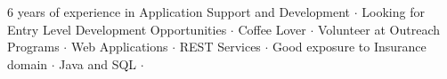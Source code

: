

\begin{cvparagraph}
6 years of experience in Application Support and Development ${\cdotp}$ Looking for Entry Level Development Opportunities ${\cdotp}$ Coffee Lover ${\cdotp}$ Volunteer at Outreach Programs ${\cdotp}$ Web Applications ${\cdotp}$ REST Services ${\cdotp}$ Good exposure to Insurance domain ${\cdotp}$ Java and SQL ${\cdotp}$
\end{cvparagraph}
